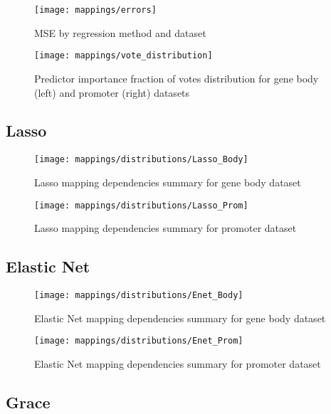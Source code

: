 
\begin{figure}[H]
	\centering
	\texttt{[image: mappings/errors]}
	\caption{MSE by regression method and dataset}
	\label{fig:map_errors}
\end{figure}

\pagebreak

\begin{figure}[H]
	\centering
	\texttt{[image: mappings/vote\_distribution]}
	\caption{Predictor importance fraction of votes distribution for gene body (left) and promoter (right) datasets}
	\label{fig:map_vote_dist}
\end{figure}


\pagebreak
\subsection{Lasso}

\begin{figure}[H]
	\centering
	\texttt{[image: mappings/distributions/Lasso\_Body]}
	\caption{Lasso mapping dependencies summary for gene body dataset}
	\label{fig:map_body_lasso}
\end{figure}

\begin{figure}[H]
	\centering
	\texttt{[image: mappings/distributions/Lasso\_Prom]}
	\caption{Lasso mapping dependencies summary for promoter dataset}
	\label{fig:map_prom_lasso}
\end{figure}


\pagebreak
\subsection{Elastic Net}

\begin{figure}[H]
	\centering
	\texttt{[image: mappings/distributions/Enet\_Body]}
	\caption{Elastic Net mapping dependencies summary for gene body dataset}
	\label{fig:map_body_enet}
\end{figure}

\begin{figure}[H]
	\centering
	\texttt{[image: mappings/distributions/Enet\_Prom]}
	\caption{Elastic Net mapping dependencies summary for promoter dataset}
	\label{fig:map_prom_enet}
\end{figure}


\pagebreak
\subsection{Grace}

